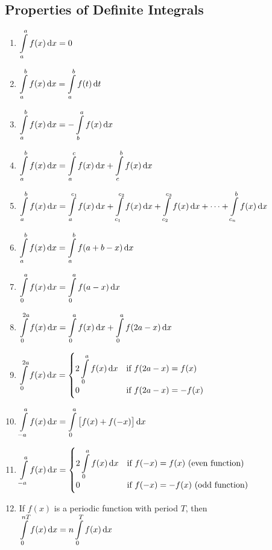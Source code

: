 \documentclass[14]{article}
\theoremstyle{definition}
\theoremstyle{case}
\begin{document}
\subsection{Properties of Definite Integrals}
\begin{enumerate}
\item $\displaystyle \int\limits_a^a f(x) \dif x = 0$
\item $\displaystyle \int\limits_a^b f(x) \dif x = \displaystyle \int\limits_a^b f(t) \dif t$
\item $\displaystyle \int\limits_a^b f(x) \dif x = - \displaystyle \int\limits_b^a f(x) \dif x$
\item $\displaystyle \int\limits_a^b f(x) \dif x = \displaystyle \int\limits_a^c f(x) \dif x + \displaystyle \int\limits_c^b f(x) \dif x$
\item $\displaystyle \int\limits_a^b f(x) \dif x = \displaystyle \int\limits_a^{c_1} f(x) \dif x + \displaystyle \int\limits_{c_1}^{c_2} f(x) \dif x + \displaystyle \int\limits_{c_2}^{c_3} f(x) \dif x + \cdots +  \displaystyle \int\limits_{c_n}^{b} f(x) \dif x$
\item $\displaystyle \int\limits_a^b f(x) \dif x = \displaystyle \int\limits_a^b f(a+b-x) \dif x$
\item $\displaystyle \int\limits_0^a f(x) \dif x = \displaystyle \int\limits_0^a f(a-x) \dif x$
\item $\displaystyle \int\limits_0^{2a} f(x) \dif x= \displaystyle \int\limits_0^a f(x) \dif x + \displaystyle \int\limits_0^a f(2a-x) \dif x$
\item $\displaystyle \int\limits_0^{2a} f(x) \dif x = \begin{cases}
      2\displaystyle\int\limits_0^a f(x) \dif x & \text{if }f(2a-x)=f(x) \\
      0 & \text{if }f(2a-x)=-f(x)
\end{cases}\, $
\item $\displaystyle\int\limits_{-a}^a f(x) \dif x = \int\limits_0^a \left[ f(x) + f(-x) \right] \dif x$
\item $\displaystyle \int\limits_{-a}^{a} f(x) \dif x = \begin{cases}
      2\displaystyle\int\limits_0^a f(x) \dif x & \text{if }f(-x)=f(x) \text{ (even function)} \\
      0 & \text{if }f(-x)=-f(x) \text{ (odd function)}
\end{cases}\, $
\item If $f(x)$ is a periodic function with period $T$, then\\
$\displaystyle \int\limits_0^{nT} f(x) \dif x = n \int\limits_0^T f(x) \dif x$
\end{enumerate}
\pagebreak
\end{document}
